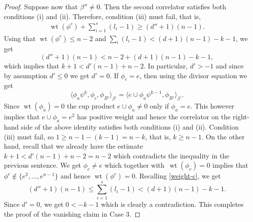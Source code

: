\documentclass[pdftex]{sigma}
\numberwithin{equation}{section}
\begin{document}
\begin{proof}
Suppose now that $\beta''\neq 0$. Then the second correlator satisfies both conditions (i) and (ii). Therefore, condition (iii) must fail, that is,
\begin{gather}\label{weight-c}
\operatorname{wt}(\phi^c) + \sum_{i=1}^s (l_i-1) \geq (d''+1)(n-1).
\end{gather}
Using that $\operatorname{wt}(\phi^c)\leq n-2$ and $\sum_i (l_i-1)<(d+1)(n-1)-k-1$, we get
\[
(d''+1)(n-1) < n-2 + (d+1)(n-1)-k-1,
\]
which implies that $k+1<d'(n-1) +n-2.$ In particular, $d'>-1$ and since by assumption $d'\leq 0$ we get $d'=0$. If $\phi_c=e$, then using the divisor equation we get
\[
\big\langle \phi_a \psi^k, \phi_c, \phi_{B'}\big\rangle_{\beta'} =
\big\langle e\cup \phi_a \psi^{k-1}, \phi_{B'}\big\rangle_{\beta'}.
\]
Since $\operatorname{wt}(\phi_a)=0$ the cup product $e\cup \phi_a\neq 0$ only if $\phi_a=e$. This however implies that $e\cup \phi_a=e^2$ has positive weight and hence the correlator on the right-hand side of the above identity satisfies both conditions (i) and (ii). Condition (iii) must fail, so $1\geq n-1-(k-1) =n-k$, that is, $k\geq n-1$. On the other hand, recall that we already have the estimate $k+1< d'(n-1) + n-2=n-2$ which contradicts the inequality in the previous sentence. We get $\phi_c\neq e$ which together with~$\operatorname{wt}(\phi_c)=0$ implies that
$\phi^c \notin \big\{e^2,\dots, e^{n-1}\big\}$ and hence $\operatorname{wt}(\phi^c)=0$. Recalling \eqref{weight-c}, we get
\[
(d''+1)(n-1) \leq \sum_{i=1}^{s} (l_i-1) < (d+1)(n-1) -k-1.
\]
Since $d'=0$, we get $0<-k-1$ which is clearly a contradiction. This completes the proof of the vanishing claim in Case 3.


\end{proof}
\end{document}

